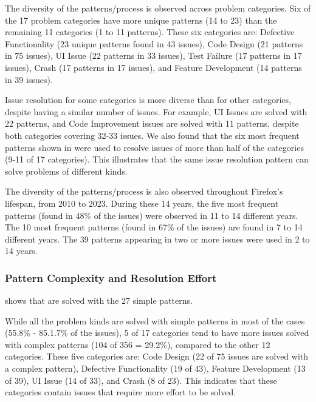 The diversity of the patterns/process is observed across problem categories. Six of the 17 problem categories have more unique patterns (14 to 23) than the remaining 11 categories (1 to 11 patterns). These six categories are: Defective Functionality (23 unique patterns found in 43  issues), Code Design (21 patterns in 75  issues), 
UI Issue (22 patterns in  33 issues), Test Failure (17 patterns in 17  issues), Crash (17 patterns in  17 issues), and
Feature Development (14 patterns in 39  issues). 

Issue resolution for some categories is more diverse than for other categories, despite having a similar number of issues. For example, UI Issues are solved with 22 patterns, and Code Improvement issues are solved with 11 patterns, despite both categories covering 32-33 issues. We also found that the six most frequent patterns shown in  were used to resolve issues of more than half of the categories  (9-11 of 17 categories). This illustrates that the same issue resolution pattern can solve problems of different kinds.

The diversity of the patterns/process is also observed throughout Firefox's lifespan, from 2010 to 2023. During these 14 years, the five most frequent patterns (found in 48\% of the issues) were observed in 11 to 14 different years. The 10 most frequent patterns (found in 67\% of the issues) are found in 7 to 14 different years. The 39 patterns appearing in two or more issues were used in 2 to 14 years.

\subsubsection{\textbf{Pattern Complexity and Resolution Effort}}  shows that  are solved with the 27 simple patterns. 

While all the problem kinds are solved with simple patterns in most of the cases (55.8\% -  85.1.7\% of the issues), 5 of 17 categories tend to have more issues solved with complex patterns (104 of 356 = 29.2\%), compared to the other 12 categories. These five categories are:  Code Design (22 of 75 issues are solved with a complex pattern),  Defective Functionality (19 of 43), Feature Development (13 of 39), UI Issue (14 of 33), and Crash (8 of 23). This indicates that these categories contain issues that require more effort to be solved. 

